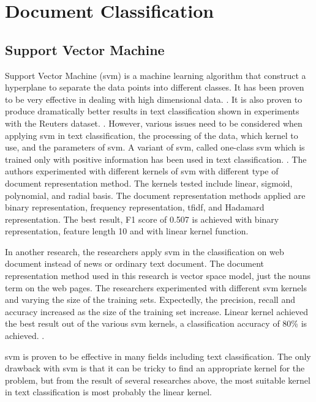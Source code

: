 \clearpage	
\section{Document Classification}
\subsection{Support Vector Machine}
Support Vector Machine (\ac{svm}) is a machine learning algorithm that construct a hyperplane to separate the data points into different classes. It has been proven to be very effective in dealing with high dimensional data. \cite{webSvm}. It is also proven to produce dramatically better results in text classification shown in experiments with the Reuters dataset. \cite{inductiveText}. However, various issues need to be considered when applying \ac{svm} in text classification, the processing of the data, which kernel to use, and the parameters of \ac{svm}. A variant of \ac{svm}, called one-class \ac{svm} which is trained only with positive information has been used in text classification. \cite{oneSvm}.  The authors experimented with different kernels of \ac{svm} with different type of document representation method. The kernels tested include linear, sigmoid, polynomial, and radial basis. The document representation methods applied are binary representation, frequency representation, \ac{tfidf}, and Hadamard representation. The best result, F1 score of 0.507 is achieved with binary representation, feature length 10 and with linear kernel function.  

In another research, the researchers apply \ac{svm} in the classification on web document instead of news or ordinary text document. The document representation method used in this research is vector space model, just the nouns term on the web pages. The researchers experimented with different \ac{svm} kernels and varying the size of the training sets. Expectedly, the precision, recall and accuracy increased as the size of the training set increase. Linear kernel achieved the best result out of the various \ac{svm} kernels, a classification accuracy of 80\% is achieved. \cite{webSvm}.
	
\Ac{svm} is proven to be effective in many fields including text classification. The only drawback with \ac{svm} is that it can be tricky to find an appropriate kernel for the problem, but from the result of several researches above, the most suitable kernel in text classification is most probably the linear kernel.\\


